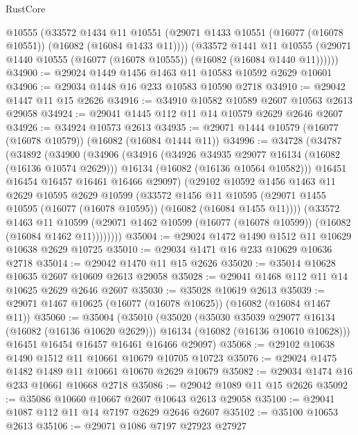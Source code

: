 \begin{lexlean}{RustCore}
\begin{coremodule}
        @10555
        (@33572
          @1434
          @11
          @10551
          (@29071 @1433 @10551 (@16077 (@16078 @10551)) (@16082 (@16084 @1433 @11))))
        (@33572
          @1441
          @11
          @10555
          (@29071 @1440 @10555 (@16077 (@16078 @10555)) (@16082 (@16084 @1440 @11))))))
@34900 := @29024 @1449 @1456 @1463 @11 @10583 @10592 @2629 @10601
@34906 := @29034 @1448 @16 @233 @10583 @10590 @2718
@34910 := @29042 @1447 @11 @15 @2626
@34916 := @34910 @10582 @10589 @2607 @10563 @2613 @29058
@34924 := @29041 @1445 @112 @11 @14 @10579 @2629 @2646 @2607
@34926 := @34924 @10573 @2613
@34935 := @29071 @1444 @10579 (@16077 (@16078 @10579)) (@16082 (@16084 @1444 @11))
@34996 := @34728
    (@34787
      (@34892
        (@34900
          (@34906
            (@34916
              (@34926 @34935 @29077 @16134 (@16082 (@16136 @10574 @2629)))
              @16134
              (@16082 (@16136 @10564 @10582)))
            @16451
            @16454
            @16457
            @16461
            @16466
            @29097)
          (@29102
            @10592
            @1456
            @1463
            @11
            @2629
            @10595
            @2629
            @10599
            (@33572
              @1456
              @11
              @10595
              (@29071 @1455 @10595 (@16077 (@16078 @10595)) (@16082 (@16084 @1455 @11))))
            (@33572
              @1463
              @11
              @10599
              (@29071 @1462 @10599 (@16077 (@16078 @10599)) (@16082 (@16084 @1462 @11))))))))
@35004 := @29024 @1472 @1490 @1512 @11 @10629 @10638 @2629 @10725
@35010 := @29034 @1471 @16 @233 @10629 @10636 @2718
@35014 := @29042 @1470 @11 @15 @2626
@35020 := @35014 @10628 @10635 @2607 @10609 @2613 @29058
@35028 := @29041 @1468 @112 @11 @14 @10625 @2629 @2646 @2607
@35030 := @35028 @10619 @2613
@35039 := @29071 @1467 @10625 (@16077 (@16078 @10625)) (@16082 (@16084 @1467 @11))
@35060 := @35004
    (@35010
      (@35020
        (@35030 @35039 @29077 @16134 (@16082 (@16136 @10620 @2629)))
        @16134
        (@16082 (@16136 @10610 @10628)))
      @16451
      @16454
      @16457
      @16461
      @16466
      @29097)
@35068 := @29102 @10638 @1490 @1512 @11 @10661 @10679 @10705 @10723
@35076 := @29024 @1475 @1482 @1489 @11 @10661 @10670 @2629 @10679
@35082 := @29034 @1474 @16 @233 @10661 @10668 @2718
@35086 := @29042 @1089 @11 @15 @2626
@35092 := @35086 @10660 @10667 @2607 @10643 @2613 @29058
@35100 := @29041 @1087 @112 @11 @14 @7197 @2629 @2646 @2607
@35102 := @35100 @10653 @2613
@35106 := @29071 @1086 @7197 @27923 @27927

\end{coremodule}
\end{lexlean}

